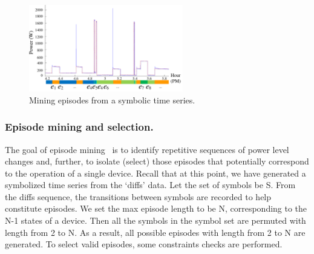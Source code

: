 \begin{figure}[!hbtp]
\centering
\includegraphics[width=0.6\textwidth]{disaggfigs/steadyevents.pdf}
\caption{Mining episodes from a symbolic time series.}
\label{fig_tevents}
\end{figure}

\subsubsection*{Episode mining and selection.} The goal of episode mining~\cite{motifgoal}
is to identify repetitive sequences of power level changes and, further, to
isolate (select) those episodes that potentially correspond to the operation
of a single device. Recall that at this point, we have generated a
symbolized time series from the `diffs' data. Let the set of symbols be S.
From the diffs sequence, the transitions between
symbols are recorded to help constitute episodes. We set the max
episode length to be N, corresponding to the N-1 states of a device. Then all
the symbols in the symbol set are permuted with length from 2 to N. As a
result, all possible episodes with length from 2 to N are generated. To select
valid episodes, some constraints checks are performed.

